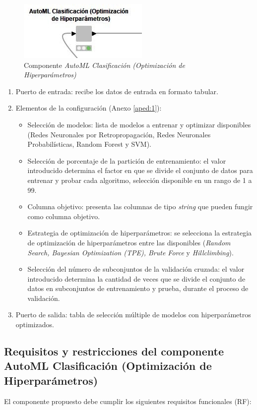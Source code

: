 \begin{figure}[H]
	\centering
	\includegraphics[width=0.35\linewidth]{"figuras/capi 2/hpo/automl-componente-hpo"}
	\caption[Componente AutoML Clasificación (Optimización de Hiperparámetros)]{Componente \textit{AutoML Clasificación (Optimización de Hiperparámetros)}}
	\label{fig:automl-componente-hpo}
\end{figure}
\begin{enumerate}
	\item Puerto de entrada: recibe los datos de entrada en formato tabular.
	\item Elementos de la configuración (Anexo \ref{aped:1}):
	\begin{itemize}
		\item Selección de modelos: lista de modelos a entrenar y optimizar disponibles (Redes Neuronales por Retropropagación, Redes Neuronales Probabilísticas, Random Forest y SVM).
		\item Selección de porcentaje de la partición de entrenamiento: el valor introducido determina el factor en que se divide el conjunto de datos para entrenar y probar cada algoritmo, selección disponible en un rango de 1 a 99. 
		\item Columna objetivo: presenta las columnas de tipo \textit{string} que pueden fungir como columna objetivo.
		\item Estrategia de optimización de hiperparámetros: se selecciona la estrategia de optimización de hiperparámetros entre las disponibles (\textit{Random Search, Bayesian Optimization (TPE), Brute Force} y \textit{Hillclimbing}).
		\item Selección del número de subconjuntos de la validación cruzada: el valor introducido determina la cantidad de veces que se divide el conjunto de datos en subconjuntos de entrenamiento y prueba, durante el proceso de validación.
	\end{itemize}
	\item Puerto de salida: tabla de selección múltiple de modelos con hiperparámetros optimizados.
\end{enumerate}

\subsection{Requisitos y restricciones del componente AutoML Clasificación (Optimización de Hiperparámetros)}
El componente propuesto debe cumplir los siguientes requisitos funcionales (RF):


